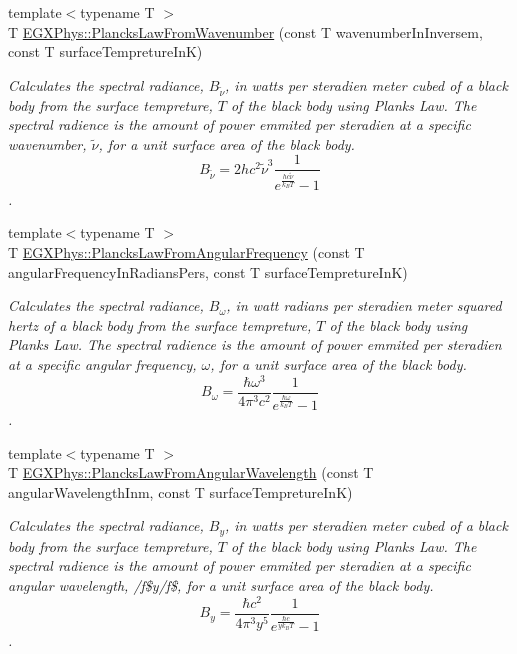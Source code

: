 \begin{DoxyCompactItemize}
{\footnotesize template$<$typename T $>$ }\\T \mbox{\hyperlink{group___e_g_x_phys-_electrodynamics-_black_body-_plancks_law_ga6648ae2a0fbff6735c1e1a04c7cac746}{E\+G\+X\+Phys\+::\+Plancks\+Law\+From\+Wavenumber}} (const T wavenumber\+In\+Inversem, const T surface\+Tempreture\+InK)
\begin{DoxyCompactList}\small\item\em Calculates the spectral radiance, $B_{\tilde {\nu }}$, in watts per steradien meter cubed of a black body from the surface tempreture, $T$ of the black body using Plank\textquotesingle{}s Law. The spectral radience is the amount of power emmited per steradien at a specific wavenumber, $\tilde {\nu }$, for a unit surface area of the black body. \[ B_{\tilde {\nu }} = 2 h c^2 \tilde {\nu }^3 \dfrac{1}{e^{\frac{hc \tilde {\nu }}{k_B T}} - 1} \]. \end{DoxyCompactList}\item 
{\footnotesize template$<$typename T $>$ }\\T \mbox{\hyperlink{group___e_g_x_phys-_electrodynamics-_black_body-_plancks_law_gaac540560c71e30c02b91d22e417b5863}{E\+G\+X\+Phys\+::\+Plancks\+Law\+From\+Angular\+Frequency}} (const T angular\+Frequency\+In\+Radians\+Pers, const T surface\+Tempreture\+InK)
\begin{DoxyCompactList}\small\item\em Calculates the spectral radiance, $B_{\omega}$, in watt radians per steradien meter squared hertz of a black body from the surface tempreture, $T$ of the black body using Plank\textquotesingle{}s Law. The spectral radience is the amount of power emmited per steradien at a specific angular frequency, $\omega$, for a unit surface area of the black body. \[ B_{\omega} = \dfrac{\hbar \omega^3}{4\pi^3c^2} \dfrac{1}{e^{\frac{\hbar\omega}{k_B T}} - 1} \]. \end{DoxyCompactList}\item 
{\footnotesize template$<$typename T $>$ }\\T \mbox{\hyperlink{group___e_g_x_phys-_electrodynamics-_black_body-_plancks_law_ga7322124727f968d28807e918c5eeb23f}{E\+G\+X\+Phys\+::\+Plancks\+Law\+From\+Angular\+Wavelength}} (const T angular\+Wavelength\+Inm, const T surface\+Tempreture\+InK)
\begin{DoxyCompactList}\small\item\em Calculates the spectral radiance, $B_{y}$, in watts per steradien meter cubed of a black body from the surface tempreture, $T$ of the black body using Plank\textquotesingle{}s Law. The spectral radience is the amount of power emmited per steradien at a specific angular wavelength, /f\$y/f\$, for a unit surface area of the black body. \[ B_{y} = \dfrac{\hbar c^2}{4\pi^3y^5} \dfrac{1}{e^{\frac{\hbar c}{y k_B T}} - 1} \]. \end{DoxyCompactList}\item 

\end{DoxyCompactItemize}
